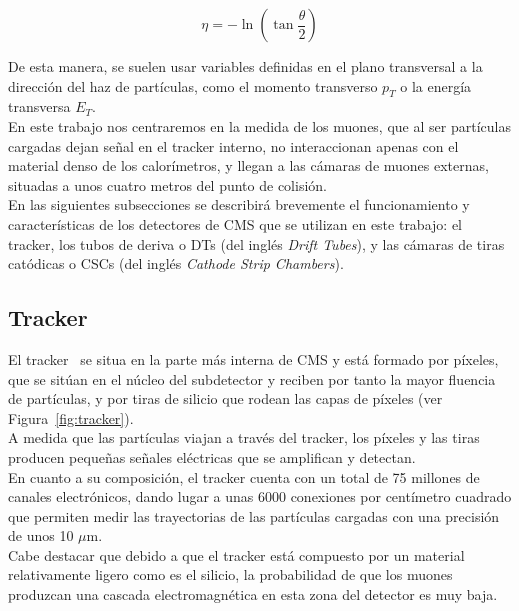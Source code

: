 \begin{equation}
  \eta = -\ln\left(\tan\dfrac{\theta}{2}\right)
\label{eq:eta}
\end{equation}


De esta manera, se suelen usar variables definidas en el plano transversal a la dirección del haz de partículas, como el momento transverso $p_{T}$ o la energía transversa $E_{T}$. \\

En este trabajo nos centraremos en la medida de los muones, que al ser part\'iculas cargadas dejan se\~nal en el tracker interno, no interaccionan apenas con el material denso de los calor\'imetros, y llegan a las c\'amaras de muones externas, situadas a unos cuatro metros del punto de colisi\'on. \\

En las siguientes subsecciones se describir\'a brevemente el funcionamiento y caracter\'isticas de los detectores de CMS que se utilizan en este trabajo: el tracker, los tubos de deriva o DTs (del ingl\'es \textit{Drift Tubes}), y las c\'amaras de tiras cat\'odicas o CSCs (del ingl\'es \textit{Cathode Strip Chambers}).

\subsection{Tracker}\label{sec:tracker}

El tracker~\cite{trackerperformance} se situa en la parte m\'as interna de CMS y est\'a formado por p\'ixeles, que se sit\'uan en el n\'ucleo del subdetector y reciben por tanto la mayor fluencia de part\'iculas, y por tiras de silicio que rodean las capas de p\'ixeles (ver Figura~\ref{fig:tracker}). \\ 

A medida que las part\'iculas viajan a trav\'es del tracker, los p\'ixeles y las tiras producen peque\~nas se\~nales el\'ectricas que se amplifican y detectan. \\
En cuanto a su composici\'on, el tracker cuenta con un total de 75 millones de canales electr\'onicos, dando lugar a unas 6000 conexiones por cent\'imetro cuadrado que permiten medir las trayectorias de las part\'iculas cargadas con una precisi\'on de unos 10 $\mu$m. \\
Cabe destacar que debido a que el tracker est\'a compuesto por un material relativamente ligero como es el silicio, la probabilidad de que los muones produzcan una cascada electromagn\'etica en esta zona del detector es muy baja.  \\

